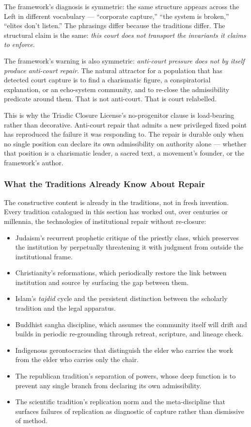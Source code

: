 \documentclass[
]{article}
\providecommand{\tightlist}{%
  \setlength{\itemsep}{0pt}\setlength{\parskip}{0pt}}
\begin{document}
The framework's diagnosis is symmetric: the same structure appears
across the Left in different vocabulary --- ``corporate capture,''
``the system is broken,'' ``elites don't listen.'' The phrasings
differ because the traditions differ. The structural claim is the
same: \emph{this court does not transport the invariants it claims
to enforce}.

The framework's warning is also symmetric: \emph{anti-court
pressure does not by itself produce anti-court repair}. The natural
attractor for a population that has detected court capture is to
find a charismatic figure, a conspiratorial explanation, or an
echo-system community, and to re-close the admissibility predicate
around them. That is not anti-court. That is court relabelled.

This is why the Triadic Closure License's no-progenitor clause is
load-bearing rather than decorative. Anti-court repair that admits
a new privileged fixed point has reproduced the failure it was
responding to. The repair is durable only when no single position
can declare its own admissibility on authority alone --- whether
that position is a charismatic leader, a sacred text, a movement's
founder, or the framework's author.

\subsubsection{What the Traditions Already Know About
Repair}\label{what-traditions-already-know-repair}

The constructive content is already in the traditions, not in
fresh invention. Every tradition catalogued in this section has
worked out, over centuries or millennia, the technologies of
institutional repair without re-closure:

\begin{itemize}
\tightlist
\item
  Judaism's recurrent prophetic critique of the priestly class,
  which preserves the institution by perpetually threatening it
  with judgment from outside the institutional frame.
\item
  Christianity's reformations, which periodically restore the link
  between institution and source by surfacing the gap between
  them.
\item
  Islam's \emph{tajdid} cycle and the persistent distinction
  between the scholarly tradition and the legal apparatus.
\item
  Buddhist sangha discipline, which assumes the community itself
  will drift and builds in periodic re-grounding through retreat,
  scripture, and lineage check.
\item
  Indigenous gerontocracies that distinguish the elder who carries
  the work from the elder who carries only the chair.
\item
  The republican tradition's separation of powers, whose deep
  function is to prevent any single branch from declaring its own
  admissibility.
\item
  The scientific tradition's replication norm and the
  meta-discipline that surfaces failures of replication as
  diagnostic of capture rather than dismissive of method.
\end{itemize}
\end{document}
